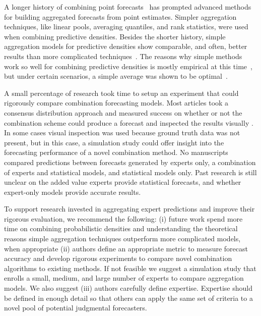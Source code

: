 \documentclass[preprint,authoryear]{elsarticle}
\begin{document}
A longer history of combining point forecasts~\citep{galton1907vox,bates1969combination,granger1984improved} has prompted advanced methods for building aggregated forecasts from point estimates. 
Simpler aggregation techniques, like linear pools, averaging quantiles, and rank statistics, were used when combining predictive densities.
Besides the shorter history, simple aggregation models for predictive densities show comparable, and often, better results than more complicated techniques~\citep{clemen1989combining,rantilla1999aggregation}.
The reasons why simple methods work so well for combining predictive densities is mostly empirical at this time~\citep{makridakis1983averages,clemen1989combining,rantilla1999aggregation}, but under certain scenarios, a simple average was shown to be optimal~\cite{wallsten1997evaluating,wallsten1997combining}.

A small percentage of research took time to setup an experiment that could rigorously compare combination forecasting models.
Most articles took a consensus distribution approach and measured success on whether or not the combination scheme could produce a forecast and inspected the results visually .
In some cases visual inspection was used because ground truth data was not present, but in this case, a simulation study could offer insight into the forecasting performance of a novel combination method.
No manuscripts compared predictions between forecasts generated by experts only, a combination of experts and statistical models, and statistical models only.
Past research is still unclear on the added value experts provide statistical forecasts, and whether expert-only models provide accurate results.

To support research invested in aggregating expert predictions and improve their rigorous evaluation, we recommend the following: (i) future work spend more time on combining probabilistic densities and understanding the theoretical reasons simple aggregation techniques outperform more complicated models, when appropriate (ii) authors define an appropriate metric to measure forecast accuracy and develop rigorous experiments to compare novel combination algorithms to existing methods.
If not feasible we suggest a simulation study that enrolls a small, medium, and large number of experts to compare aggregation models.
We also suggest (iii) authors carefully define expertise.
Expertise should be defined in enough detail so that others can apply the same set of criteria to a novel pool of  potential judgmental forecasters.
\end{document}
